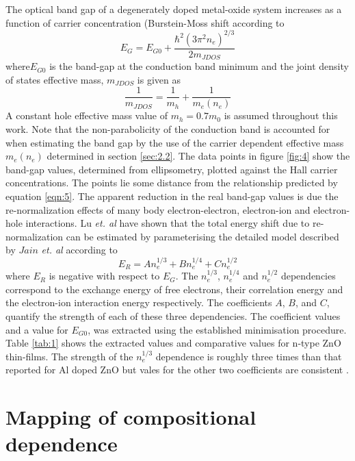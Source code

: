 \documentclass[aps,prl,preprint,showpacs,showkeys, linenumbers]{revtex4-1}
\begin{document}
The optical band gap of a degenerately doped metal-oxide system increases as a function of carrier concentration (Burstein-Moss shift \cite{Burstein1954,Moss1954} according to
\begin{equation}
\label{eqn:5}
E_G = E_{G0} + \frac{\hbar^2(3\pi^2n_e)^{2/3}}{2m_{JDOS}}
\end{equation}
where$E_{G0}$ is the band-gap at the conduction band minimum and the joint density of states effective mass, $m_{JDOS}$ is given as
\begin{equation}
\label{eqn:6}
\frac{1}{m_{JDOS}} = \frac{1}{m_h}+\frac{1}{m_e(n_e)}
\end{equation}
A constant hole effective mass value of $m_h = 0.7m_0$ \cite{Beni1979, Reynolds1996} is assumed throughout this work. Note that the non-parabolicity of the conduction band is accounted for when estimating the band gap by the use of the carrier dependent effective mass $m_e(n_e)$ determined in section \ref{sec:2.2}. The data points in figure \ref{fig:4} show the band-gap values, determined from ellipsometry, plotted against the Hall carrier concentrations. The points lie some distance from the relationship predicted by equation \ref{eqn:5}. The apparent reduction in the real band-gap values is due the re-normalization effects of many body electron-electron, electron-ion and electron-hole interactions. Lu \textit{et. al} \cite{Lu2007} have shown that the total energy shift due to re-normalization can be estimated by parameterising the detailed model described by $Jain$ \textit{et. al} \cite{Jain1990, Jain1991} according to 
\begin{equation}
\label{eqn:7}
E_R = An_e^{1/3} + Bn_e^{1/4} + Cn_e^{1/2}
\end{equation}
where $E_R$ is negative with respect to $E_G$. The $n_e^{1/3}$, $n_e^{1/4}$ and $n_e^{1/2}$ dependencies correspond to the exchange energy of free electrons, their correlation energy and the electron-ion interaction energy respectively. The coefficients $A$, $B$, and $C$, quantify the strength of each of these three dependencies. The coefficient values and a value for $E_{G0}$, was extracted using the established minimisation procedure. Table \ref{tab:1} shows the extracted values and comparative values for n-type ZnO thin-films. The strength of the $n_e^{1/3}$ dependence is roughly three times than that reported for Al doped ZnO but vales for the other two coefficients are consistent \cite{Lu2007}.

\section{Mapping of compositional dependence}
\label{sec:2.3}
\end{document}
